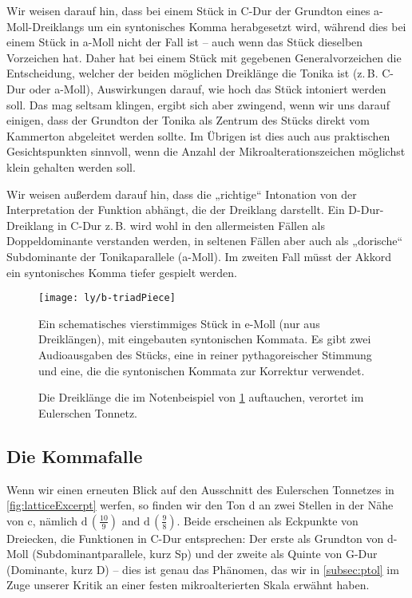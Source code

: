 Wir weisen darauf hin, dass bei einem Stück in C-Dur der Grundton eines
a-Moll-Dreiklangs um ein syntonisches Komma herabgesetzt wird, während dies bei
einem Stück in a-Moll nicht der Fall ist – auch wenn das Stück dieselben
Vorzeichen hat. Daher hat bei einem Stück mit gegebenen Generalvorzeichen die
Entscheidung, welcher der beiden möglichen Dreiklänge die Tonika ist
(z.\,B. C-Dur oder a-Moll), Auswirkungen darauf, wie hoch das Stück intoniert
werden soll. Das mag seltsam klingen, ergibt sich aber zwingend, wenn wir uns
darauf einigen, dass der Grundton der Tonika als Zentrum des Stücks direkt vom
Kammerton abgeleitet werden sollte. Im Übrigen ist dies auch aus praktischen
Gesichtspunkten sinnvoll, wenn die Anzahl der Mikroalterationszeichen möglichst
klein gehalten werden soll.

Wir weisen außerdem darauf hin, dass die „richtige“ Intonation von der
Interpretation der Funktion abhängt, die der Dreiklang darstellt. Ein
D-Dur-Dreiklang in C-Dur z.\,B.  wird wohl in den allermeisten Fällen als
Doppeldominante verstanden werden, in seltenen Fällen aber auch als „dorische“
Subdominante der Tonikaparallele (a-Moll). Im zweiten Fall müsst der Akkord ein
syntonisches Komma tiefer gespielt werden.

\begin{figure}
  \centering
  \texttt{[image: ly/b-triadPiece]}
  \caption{Ein schematisches vierstimmiges Stück in e-Moll (nur aus
  	Dreiklängen), mit eingebauten syntonischen Kommata. Es gibt zwei
  	Audioausgaben des Stücks, eine in reiner pythagoreischer Stimmung und eine,
  	die die syntonischen Kommata zur Korrektur
  	verwendet.}\label{fig:triadPiece}
\end{figure}

\begin{figure}
  
  \caption{Die Dreiklänge die im Notenbeispiel von \cref{fig:triadPiece} auftauchen, verortet im
  	Eulerschen Tonnetz.}\label{fig:chordsLattice}
\end{figure}

\subsection{Die Kommafalle}

Wenn wir einen erneuten Blick auf den Ausschnitt des Eulerschen Tonnetzes in
\cref{fig:latticeExcerpt} werfen, so finden wir den Ton d an zwei Stellen in der
Nähe von c, nämlich \naturalm $\text{d}\,(\frac{10}9)$ and
$\text{d}\,(\frac98)$. Beide erscheinen als Eckpunkte von Dreiecken, die
Funktionen in C-Dur entsprechen: Der erste als Grundton von d-Moll
(Subdominantparallele, kurz Sp) und der zweite als Quinte von G-Dur (Dominante,
kurz D) – dies ist genau das Phänomen, das wir in \cref{subsec:ptol} im Zuge
unserer Kritik an einer festen mikroalterierten Skala erwähnt haben.

